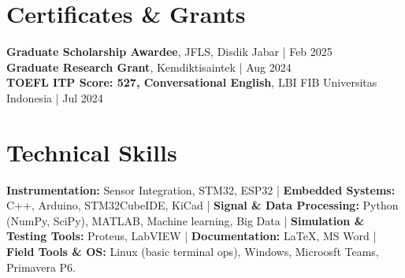 \documentclass[10pt,a4paper]{article}
\begin{document}
\section*{Certificates \& Grants}

\textbf{Graduate Scholarship Awardee}, JFLS, Disdik Jabar \quad | \quad Feb 2025 \\
\textbf{Graduate Research Grant}, Kemdiktisaintek \quad | \quad Aug 2024 \\
\textbf{TOEFL ITP Score: 527, Conversational English}, LBI FIB Universitas Indonesia \quad | \quad Jul 2024

\section*{Technical Skills}

\textbf{Instrumentation:} Sensor Integration, STM32, ESP32 \quad | \quad
\textbf{Embedded Systems:} C++, Arduino, STM32CubeIDE, KiCad   \quad | \quad
\textbf{Signal \& Data Processing:} Python (NumPy, SciPy), MATLAB, Machine learning, Big Data \quad | \quad
\textbf{Simulation \& Testing Tools:} Proteus, LabVIEW \quad | \quad
\textbf{Documentation:} LaTeX, MS Word \quad | \quad
\textbf{Field Tools \& OS:} Linux (basic terminal ops), Windows, Microosft Teams, Primavera P6.
\end{document}
